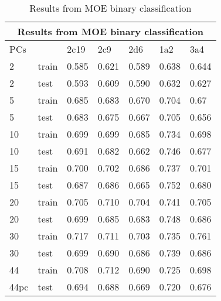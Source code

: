 
\begin{table}[!htbp]
\begin{tabular}{|l|l|l|l|l|l|l|}
\hline
\multicolumn{7}{|c|}{Results from MOE binary classification}                        \\ \hline
PCs  &       & 2c19  & 2c9   & 2d6   & 1a2   & 3a4   \\ \hline
2    & train & 0.585 & 0.621 & 0.589 & 0.638 & 0.644 \\ \hline
2    & test  & 0.593 & 0.609 & 0.590 & 0.632 & 0.627 \\ \hline
5    & train & 0.685 & 0.683 & 0.670 & 0.704 & 0.67  \\ \hline
5    & test  & 0.683 & 0.675 & 0.667 & 0.705 & 0.656 \\ \hline
10   & train & 0.699 & 0.699 & 0.685 & 0.734 & 0.698 \\ \hline
10   & test  & 0.691 & 0.682 & 0.662 & 0.746 & 0.677 \\ \hline
15   & train & 0.700 & 0.702 & 0.686 & 0.737 & 0.701 \\ \hline
15   & test  & 0.687 & 0.686 & 0.665 & 0.752 & 0.680 \\ \hline
20   & train & 0.705 & 0.710 & 0.704 & 0.741 & 0.705 \\ \hline
20   & test  & 0.699 & 0.685 & 0.683 & 0.748 & 0.686 \\ \hline
30   & train & 0.717 & 0.711 & 0.703 & 0.735 & 0.761 \\ \hline
30   & test  & 0.699 & 0.690 & 0.686 & 0.739 & 0.686 \\ \hline
44   & train & 0.708 & 0.712 & 0.690 & 0.725 & 0.698 \\ \hline
44pc & test  & 0.694 & 0.688 & 0.669 & 0.720 & 0.676 \\ \hline
\end{tabular}
\caption{Results from MOE binary classification}
\end{table}


